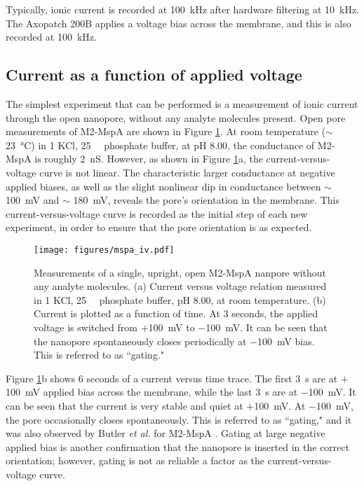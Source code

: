 Typically, ionic current is recorded at \SI{100}{\kHz} after hardware filtering at \SI{10}{\kHz}.  The Axopatch 200B applies a voltage bias across the membrane, and this is also recorded at \SI{100}{\kHz}.

\subsection{Current as a function of applied voltage}

The simplest experiment that can be performed is a measurement of ionic current through the open nanopore, without any analyte molecules present.  Open pore measurements of M2-MspA are shown in Figure \ref{fig:iv_mspa}.  At room temperature ($\sim$ \SI{23}{\degreeCelsius}) in \SI{1}{\Molar} KCl, \SI{25}{\milli\Molar} phosphate buffer, at pH \num{8.00}, the conductance of M2-MspA is roughly \SI{2}{\nano\siemens}.  However, as shown in Figure \ref{fig:iv_mspa}a, the current-versus-voltage curve is not linear.  The characteristic larger conductance at negative applied biases, as well as the slight nonlinear dip in conductance between $\sim$ \SI{100}{\mV} and $\sim$ \SI{180}{\mV}, reveals the pore's orientation in the membrane.  This current-versus-voltage curve is recorded as the initial step of each new experiment, in order to ensure that the pore orientation is as expected.

\begin{figure}[h]
\begin{centering}
\texttt{[image: figures/mspa\_iv.pdf]}
\caption[MspA current versus voltage]{Measurements of a single, upright, open M2-MspA nanpore without any analyte molecules.  (a) Current versus voltage relation measured in \SI{1}{\Molar} KCl, \SI{25}{\milli\Molar} phosphate buffer, pH \num{8.00}, at room temperature.  (b) Current is plotted as a function of time.  At \num{3} seconds, the applied voltage is switched from $+$\SI{100}{\milli\volt} to \SI{-100}{\milli\volt}.  It can be seen that the nanopore spontaneously closes periodically at \SI{-100}{\milli\volt} bias.  This is referred to as ``gating."}
\label{fig:iv_mspa}
\end{centering}
\end{figure}

Figure \ref{fig:iv_mspa}b shows \num{6} seconds of a current versus time trace.  The first \SI{3}{\s} are at $+$\SI{100}{\mV} applied bias across the membrane, while the last \SI{3}{\s} are at $-$\SI{100}{\mV}.  It can be seen that the current is very stable and quiet at $+$\SI{100}{\mV}.  At $-$\SI{100}{\mV}, the pore occasionally closes spontaneously.  This is referred to as ``gating," and it was also observed by Butler \textit{et al.} for M2-MspA \citep{Butler2008}.  Gating at large negative applied bias is another confirmation that the nanopore is inserted in the correct orientation; however, gating is not as reliable a factor as the current-versus-voltage curve.


